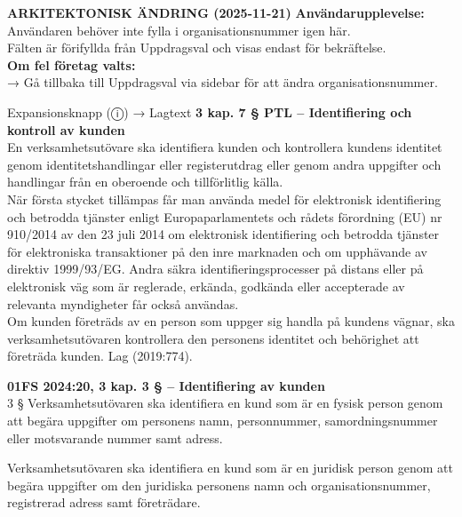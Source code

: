 \documentclass[10pt]{beamer}
\begin{document}
\begin{frame}[label=riskfragor-steg1]
\begin{block}{\textbf{ARKITEKTONISK ÄNDRING (2025-11-21)}}
    \tiny \textbf{Användarupplevelse:}\\
    \tiny Användaren behöver inte fylla i organisationsnummer igen här.\\
    \tiny Fälten är förifyllda från Uppdragsval och visas endast för bekräftelse.\\[0.2cm]
    
    \tiny \textbf{Om fel företag valts:}\\
    \tiny → Gå tillbaka till Uppdragsval via sidebar för att ändra organisationsnummer.
  \end{block}
  \begin{alertblock}{Expansionsknapp (ⓘ) → Lagtext}
    \tiny \textbf{3 kap. 7 §  PTL – Identifiering och kontroll av kunden}\\
    \tiny En verksamhetsutövare ska identifiera kunden och kontrollera kundens identitet
     genom identitetshandlingar eller registerutdrag eller genom andra uppgifter och handlingar
     från en oberoende och tillförlitlig källa.\\

    \tiny När första stycket tillämpas får man använda medel för elektronisk identifiering och
     betrodda tjänster enligt Europaparlamentets och rådets förordning (EU) nr 910/2014 av den
     23 juli 2014 om elektronisk identifiering och betrodda tjänster för elektroniska transaktioner
     på den inre marknaden och om upphävande av direktiv 1999/93/EG. Andra säkra identifieringsprocesser 
     på distans eller på elektronisk väg som är reglerade, erkända, godkända eller accepterade av 
     relevanta myndigheter får också användas.\\

    \tiny Om kunden företräds av en person som uppger sig handla på kundens vägnar, ska verksamhetsutövaren
     kontrollera den personens identitet och behörighet att företräda kunden. Lag (2019:774).
     \vspace{0.1cm}
    
    \tiny \textbf{01FS 2024:20, 3 kap. 3 §  – Identifiering av kunden}\\
    \tiny 3 § Verksamhetsutövaren ska identifiera en kund som är en fysisk person genom att begära
     uppgifter om personens namn, personnummer, samordningsnummer eller motsvarande nummer samt adress.

    \tiny Verksamhetsutövaren ska identifiera en kund som är en juridisk person genom att begära
     uppgifter om den juridiska personens namn och organisationsnummer, registrerad adress samt företrädare.


\end{alertblock}
\end{frame}
\end{document}
